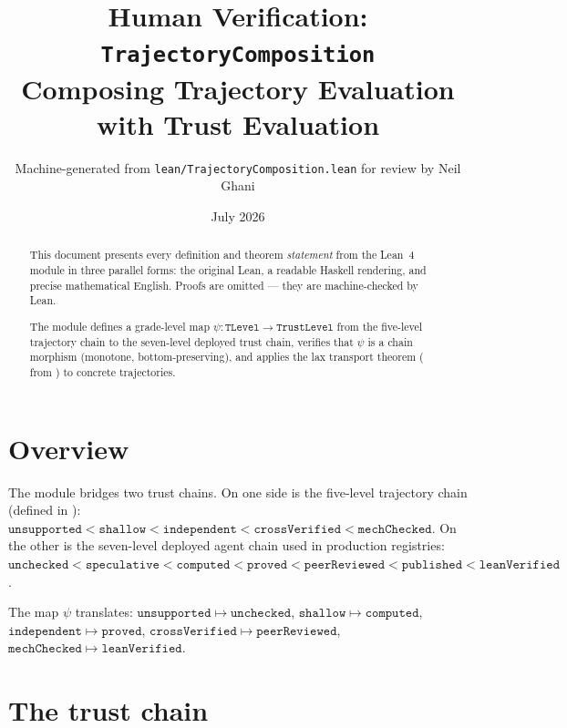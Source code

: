 \documentclass[11pt,a4paper]{article}
\title{Human Verification: \texttt{TrajectoryComposition}\\[4pt]
  \large Composing Trajectory Evaluation with Trust Evaluation}
\author{Machine-generated from \texttt{lean/TrajectoryComposition.lean} for review by Neil Ghani}
\date{July 2026}
\begin{document}
\maketitle

\begin{abstract}
This document presents every definition and theorem \emph{statement} from the
Lean~4 module  in three parallel forms: the original
Lean, a readable Haskell rendering, and precise mathematical English.  Proofs
are omitted --- they are machine-checked by Lean.

The module defines a grade-level map $\psi : \mathtt{TLevel} \to
\mathtt{TrustLevel}$ from the five-level trajectory chain to the seven-level
deployed trust chain, verifies that $\psi$ is a chain morphism (monotone,
bottom-preserving), and applies the lax transport theorem
( from ) to concrete trajectories.
\end{abstract}

\tableofcontents
\bigskip

\section{Overview}

The module bridges two trust chains.  On one side is the five-level trajectory
chain  (defined in ): $\mathtt{unsupported}
< \mathtt{shallow} < \mathtt{independent} < \mathtt{crossVerified} <
\mathtt{mechChecked}$.  On the other is the seven-level deployed agent chain
 used in production registries: $\mathtt{unchecked} <
\mathtt{speculative} < \mathtt{computed} < \mathtt{proved} <
\mathtt{peerReviewed} < \mathtt{published} < \mathtt{leanVerified}$.

The map $\psi$ translates: $\mathtt{unsupported} \mapsto \mathtt{unchecked}$,
$\mathtt{shallow} \mapsto \mathtt{computed}$, $\mathtt{independent} \mapsto
\mathtt{proved}$, $\mathtt{crossVerified} \mapsto \mathtt{peerReviewed}$,
$\mathtt{mechChecked} \mapsto \mathtt{leanVerified}$.

\section{The trust chain}
\end{document}
